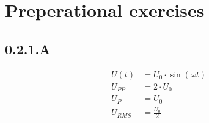 \section{Preperational exercises}
\subsection*{0.2.1.A}
\begin{eqnarray*}
U(t)&=U_0\cdot\sin(\omega t)\\
U_{PP}&=2\cdot U_0\\
U_P&=U_0\\
U_{RMS}&=\frac{U_0}{2}
\end{eqnarray*}